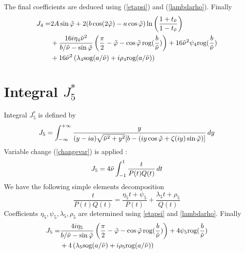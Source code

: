 The final coefficients are deduced using (\ref{etapsi}) and (\ref{lambdarho}). Finally
\begin{equation}
\begin{split}
J_4= &2A\sin\tilde{\varphi} +2(b\cos(2\tilde{\varphi})-a\cos\tilde{\varphi})\ln\left(\frac{1+t_{\tilde{\nu}}}{1-t_{\tilde{\nu}}}\right)\\
&+\frac{16i\eta_4\tilde{\nu}^2}{b/\tilde{\nu}-\sin\tilde{\varphi}}\left(\frac{\pi}{2}-\tilde{\varphi}-\cos\tilde{\varphi} \,\mbox{rog}(\frac{b}{\tilde{\nu}}) \right)+16\tilde{\nu}^2\psi_4 \mbox{rog}(\frac{b}{\tilde{\nu}} )\\
&+16\tilde{\nu}^2\left(\lambda_4 \mbox{sog}(a/\tilde{\nu})+i\rho_4 \mbox{rog}(a/\tilde{\nu}) \right)
\end{split}
\label{valJ4}
\end{equation}

\section{Integral $J_5^*$}
\label{calculJ5}
Integral $J_5^*$ is defined by
\begin{equation}
J_5=\int_{-\infty}^{+\infty} \frac{y}{(y-ia)\sqrt{\tilde{\nu}^2+y^2}\lbrack b-( iy\cos \tilde{\varphi}+ \zeta(iy)\sin \tilde{\varphi}) \rbrack}\,dy
\label{defJ5}
\end{equation}
Variable change (\ref{changevar}) is applied :
\begin{equation}
J_5=4\tilde{\nu}\int_{-1}^1 \frac{t}{P(t)Q(t)}\,dt
\end{equation}
We have the following simple elements decomposition
\begin{equation}
\frac{t}{P(t)Q(t)}=\frac{\eta_5 t+\psi_5}{P(t)}+\frac{\lambda_5 t +\rho_5}{Q(t)}
\end{equation}
Coefficients $\eta_5,\psi_5,\lambda_5,\rho_5$ are determined using \eqref{etapsi} and \eqref{lambdarho}. Finally
\begin{equation}
\begin{split}
J_5=&\frac{4i\eta_5}{b/\tilde{\nu}-\sin\tilde{\varphi}}\left(\frac{\pi}{2}-\tilde{\varphi}-\cos\tilde{\varphi} \,\mbox{rog}(\frac{b}{\tilde{\nu}}) \right)+4\psi_5 \mbox{rog}(\frac{b}{\tilde{\nu}} )\\
&+4\left(\lambda_5 \mbox{sog}(a/\tilde{\nu})+i\rho_5 \mbox{rog}(a/\tilde{\nu}) \right)
\end{split}
\label{valJ5}
\end{equation}

